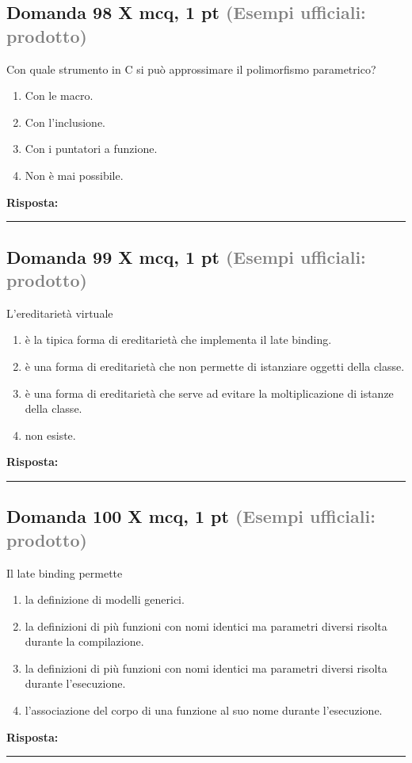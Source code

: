 \documentclass[a4paper,11pt]{article}
\begin{document}
\subsection*{Domanda 98 X \hfill {\small mcq, 1 pt \textcolor{gray}{(Esempi ufficiali: prodotto)}}}
Con quale strumento in C si può approssimare il polimorfismo parametrico?

\begin{enumerate}[label=\alph*)]
\item Con le macro.
\item Con l'inclusione.
\item Con i puntatori a funzione.
\item Non è mai possibile.
\end{enumerate}
\vspace{0.2cm}
\noindent\textbf{Risposta:}\par
\vspace{1.5cm}\hrule


\subsection*{Domanda 99 X \hfill {\small mcq, 1 pt \textcolor{gray}{(Esempi ufficiali: prodotto)}}}
L'ereditarietà virtuale

\begin{enumerate}[label=\alph*)]
\item è la tipica forma di ereditarietà che implementa il late binding.
\item è una forma di ereditarietà che non permette di istanziare oggetti della classe.
\item è una forma di ereditarietà che serve ad evitare la moltiplicazione di istanze della classe.
\item non esiste.
\end{enumerate}
\vspace{0.2cm}
\noindent\textbf{Risposta:}\par
\vspace{1.5cm}\hrule


\subsection*{Domanda 100 X \hfill {\small mcq, 1 pt \textcolor{gray}{(Esempi ufficiali: prodotto)}}}
Il late binding permette

\begin{enumerate}[label=\alph*)]
\item la definizione di modelli generici.
\item la definizioni di più funzioni con nomi identici ma parametri diversi risolta durante la compilazione.
\item la definizioni di più funzioni con nomi identici ma parametri diversi risolta durante l'esecuzione.
\item l'associazione del corpo di una funzione al suo nome durante l'esecuzione.
\end{enumerate}
\vspace{0.2cm}
\noindent\textbf{Risposta:}\par
\vspace{1.5cm}\hrule
\end{document}
